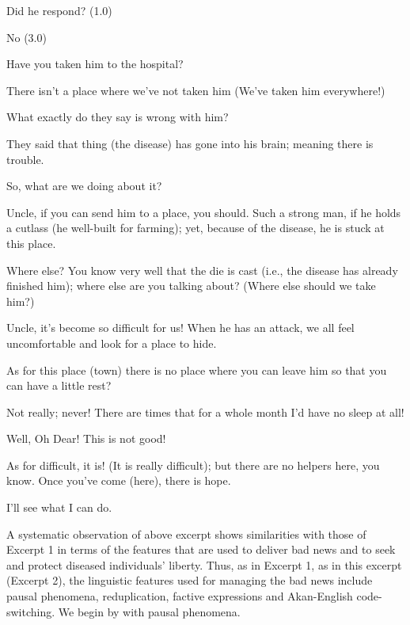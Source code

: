 \documentclass[output=paper,colorlinks,citecolor=brown]{langscibook}
\begin{document}
\begin{description}[style=unboxed,font=\normalfont]
    \item[T11 AS:] Did he respond? (1.0)
    \item[T12 KO:] No (3.0) 
    \item[T13 KO:] Have you taken him to the hospital?
    \item[T14 AC:] There isn’t a place where we’ve not taken him (We’ve taken him everywhere!)
    \item[T15 KO:] What exactly do they say is wrong with him?
    \item[T16 AC:] They said that thing (the disease) has gone into his brain; meaning there is trouble.
    \item[T17 KO:] So, what are we doing about it?
    \item[T18 AS:] Uncle, if you can send him to a place, you should. Such a strong man, if he holds a cutlass (he well-built for farming); yet, because of the disease, he is stuck at this place.
    \item[T19 AC:] Where else? You know very well that the die is cast (i.e., the disease has already finished him); where else are you talking about? (Where else should we take him?)
    \item[T20 AS:] Uncle, it’s become so difficult for us! When he has an attack, we all feel uncomfortable and look for a place to hide.
    \item[T21 KO:] As for this place (town) there is no place where you can leave him so that you can have a little rest?
    \item[T22 AC:] Not really; never! There are times that for a whole month I’d have no sleep at all!
    \item[T23 KO:] Well, Oh Dear! This is not good!
    \item[T24 AS:] As for difficult, it is! (It is really difficult); but there are no helpers here, you know. Once you’ve come (here), there is hope.
    \item[T25 KO:] I’ll see what I can do.
\end{description}

\indent A systematic observation of above excerpt shows similarities with those of Excerpt 1 in terms of the features that are used to deliver bad news and to seek and protect diseased individuals’ liberty. Thus, as in Excerpt 1, as in this excerpt (Excerpt 2), the linguistic features used for managing the bad news include pausal phenomena, reduplication, factive expressions and Akan-English code-switching. We begin by with pausal phenomena. 
\end{document}
